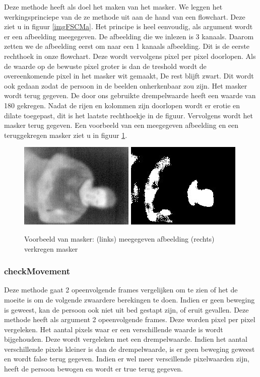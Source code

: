 Deze methode heeft als doel het maken van het masker. We leggen het werkingsprinciepe van de ze methode uit aan de hand van een flowchart. Deze ziet u in figuur \ref{imgFSCMa}. Het principe is heel eenvoudig, als argument wordt er een afbeelding meegegeven. De afbeelding die we inlezen is 3 kanaals. Daarom zetten we de afbeelding eerst om naar een 1 kanaals afbeelding. Dit is de eerste rechthoek in onze flowchart.  Deze wordt vervolgens  pixel per pixel doorlopen. Als de waarde op de bewuste pixel groter is dan de treshold wordt de overeenkomende pixel in het masker wit gemaakt, De rest blijft zwart. Dit wordt ook gedaan zodat de persoon in de beelden onherkenbaar zou zijn. Het masker wordt terug gegeven. De door ons gebruikte drempelwaarde heeft een waarde van 180 gekregen. Nadat de rijen en kolommen zijn doorlopen wordt er erotie en dilate toegepast, dit is het laatste rechthoekje in de figuur. Vervolgens wordt het masker terug gegeven.  Een voorbeeld van een meegegeven afbeelding en een teruggekregen masker ziet u in figuur \ref{imgCMa}.

\begin{figure}[h]
	\includegraphics[scale=0.75]{EersteExperiment_img0}
	\includegraphics[scale = 0.75]{EersteExperiment_mask0}
	\caption{Voorbeeld van masker: (links) meegegeven afbeelding (rechts) verkregen masker}
	\label{imgCMa}
\end{figure}

\subsubsection{checkMovement}
Deze methode gaat 2 opeenvolgende frames vergelijken om te zien of het de moeite is om de volgende zwaardere berekingen te doen. Indien er geen beweging is geweest, kan de persoon ook niet uit bed gestapt zijn, of eruit gevallen. Deze methode heeft als argument 2 opeenvolgende frames. Deze worden pixel per pixel vergeleken. Het aantal pixels waar er een verschillende waarde is wordt bijgehouden. Deze wordt vergeleken met een drempelwaarde. Indien het aantal verschillende pixels kleiner is dan de drempelwaarde, is er geen beweging geweest en wordt false terug gegeven. Indien er wel meer verscillende pixelwaarden zijn, heeft de persoon bewogen en wordt er true terug gegeven.

